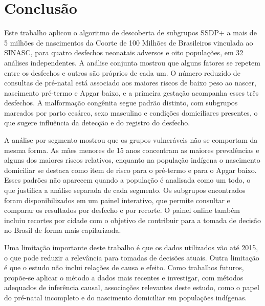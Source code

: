 
\section{Conclusão}\label{sec:conclusao}

Este trabalho aplicou o algoritmo de descoberta de subgrupos SSDP+ a mais de 5 milhões de nascimentos da Coorte de 100 Milhões de Brasileiros vinculada ao SINASC, para quatro desfechos neonatais adversos e oito populações, em 32 análises independentes. 
A análise conjunta mostrou que alguns fatores se repetem entre os desfechos e outros são próprios de cada um. O número reduzido de consultas de pré-natal está associado aos maiores riscos de baixo peso ao nascer, nascimento pré-termo e Apgar baixo, e a primeira gestação acompanha esses três desfechos. A malformação congênita segue padrão distinto, com subgrupos marcados por parto cesáreo, sexo masculino e condições domiciliares presentes, o que sugere influência da detecção e do registro do desfecho.

A análise por segmento mostrou que os grupos vulneráveis não se comportam da mesma forma. As mães menores de 15 anos concentram as maiores prevalências e alguns dos maiores riscos relativos, enquanto na população indígena o nascimento domiciliar se destaca como item de risco para o pré-termo e para o Apgar baixo. Esses padrões não aparecem quando a população é analisada como um todo, o que justifica a análise separada de cada segmento. Os subgrupos encontrados foram disponibilizados em um painel interativo, que permite consultar e comparar os resultados por desfecho e por recorte.
O painel online também incluiu recortes por cidade com o objetivo de contribuir para a tomada de decisão no Brasil de forma mais capilarizada. 

Uma limitação importante deste trabalho é que os dados utilizados vão até 2015, o que pode reduzir a relevância para tomadas de decisões atuais.
Outra limitação é que o estudo não inclui relações de causa e efeito.
Como trabalhos futuros, propõe-se aplicar o método a dados mais recentes e investigar, com métodos adequados de inferência causal, associações relevantes deste estudo, como o papel do pré-natal incompleto e do nascimento domiciliar em populações indígenas.
